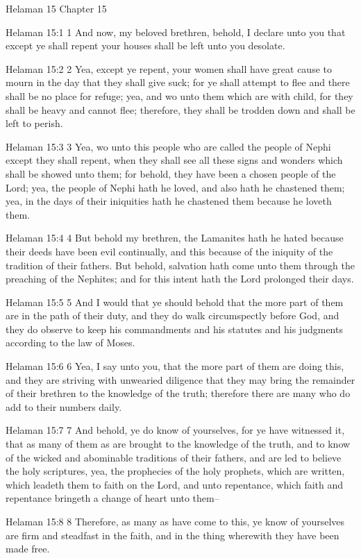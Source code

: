 Helaman 15
Chapter 15

Helaman 15:1
 1 And now, my beloved brethren, behold, I declare unto you that
except ye shall repent your houses shall be left unto you
desolate.

Helaman 15:2
 2 Yea, except ye repent, your women shall have great cause to
mourn in the day that they shall give suck; for ye shall attempt
to flee and there shall be no place for refuge; yea, and wo unto
them which are with child, for they shall be heavy and cannot
flee; therefore, they shall be trodden down and shall be left to
perish.

Helaman 15:3
 3 Yea, wo unto this people who are called the people of Nephi
except they shall repent, when they shall see all these signs and
wonders which shall be showed unto them; for behold, they have
been a chosen people of the Lord; yea, the people of Nephi hath
he loved, and also hath he chastened them; yea, in the days of
their iniquities hath he chastened them because he loveth them.

Helaman 15:4
 4 But behold my brethren, the Lamanites hath he hated because
their deeds have been evil continually, and this because of the
iniquity of the tradition of their fathers. But behold,
salvation hath come unto them through the preaching of the
Nephites; and for this intent hath the Lord prolonged their days.

Helaman 15:5
 5 And I would that ye should behold that the more part of them
are in the path of their duty, and they do walk circumspectly
before God, and they do observe to keep his commandments and his
statutes and his judgments according to the law of Moses.

Helaman 15:6
 6 Yea, I say unto you, that the more part of them are doing
this, and they are striving with unwearied diligence that they
may bring the remainder of their brethren to the knowledge of the
truth; therefore there are many who do add to their numbers
daily.

Helaman 15:7
 7 And behold, ye do know of yourselves, for ye have witnessed
it, that as many of them as are brought to the knowledge of the
truth, and to know of the wicked and abominable traditions of
their fathers, and are led to believe the holy scriptures, yea,
the prophecies of the holy prophets, which are written, which
leadeth them to faith on the Lord, and unto repentance, which
faith and repentance bringeth a change of heart unto them--

Helaman 15:8
 8 Therefore, as many as have come to this, ye know of yourselves
are firm and steadfast in the faith, and in the thing wherewith
they have been made free.

